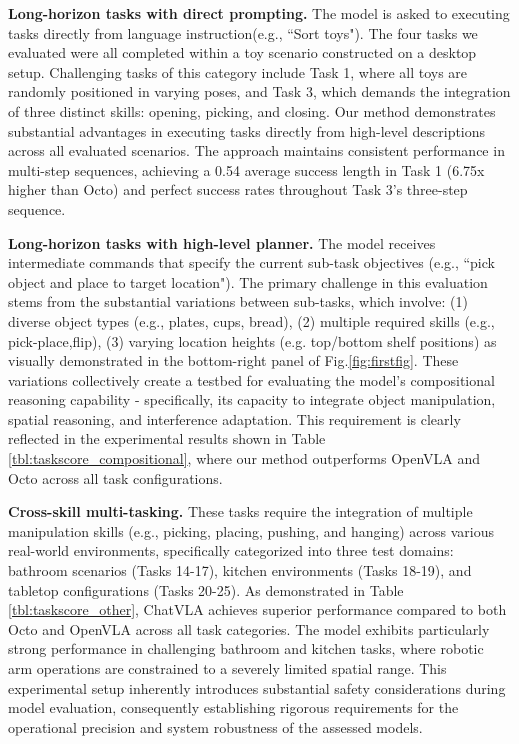 \textbf{Long-horizon tasks with direct prompting.} The model is asked to executing tasks directly from language instruction(e.g., ``Sort toys"). The four tasks we evaluated were all completed within a toy scenario constructed on a desktop setup.
Challenging tasks of this category include Task 1, where all toys are randomly positioned in varying poses, and Task 3, which demands the integration of three distinct skills: opening, picking, and closing.
Our method demonstrates substantial advantages in executing tasks directly from high-level descriptions across all evaluated scenarios. The approach maintains consistent performance in multi-step sequences, achieving a 0.54 average success length in Task 1 (6.75x higher than Octo) and perfect success rates throughout Task 3’s three-step sequence.


\textbf{Long-horizon tasks with high-level planner.} The model receives intermediate commands that specify the current sub-task objectives (e.g., ``pick object and place to target location"). The primary challenge in this evaluation stems from the substantial variations between sub-tasks, which involve: (1) diverse object types (e.g., plates, cups, bread), (2) multiple required skills (e.g., pick-place,flip), (3) varying location heights (e.g. top/bottom shelf positions) as visually demonstrated in the bottom-right panel of Fig.\ref{fig:firstfig}. These variations collectively create a testbed for evaluating the model's compositional reasoning capability - specifically, its capacity to integrate object manipulation, spatial reasoning, and interference adaptation. This requirement is clearly reflected in the experimental results shown in Table \ref{tbl:taskscore_compositional}, where our method outperforms OpenVLA and Octo across all task configurations.

\textbf{Cross-skill multi-tasking.} These tasks require the integration of multiple manipulation skills (e.g., picking, placing, pushing, and hanging) across various real-world environments, specifically categorized into three test domains: bathroom scenarios (Tasks 14-17), kitchen environments (Tasks 18-19), and tabletop configurations (Tasks 20-25). As demonstrated in Table \ref{tbl:taskscore_other}, ChatVLA achieves superior performance compared to both Octo and OpenVLA across all task categories. The model exhibits particularly strong performance in challenging bathroom and kitchen tasks, where robotic arm operations are constrained to a severely limited spatial range. This experimental setup inherently introduces substantial safety considerations during model evaluation, consequently establishing rigorous requirements for the operational precision and system robustness of the assessed models.

